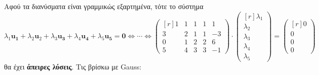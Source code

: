 \documentclass[a4paper,table]{report}
\begin{document}
Αφού τα διανύσματα είναι γραμμικώς εξαρτημένα, τότε το σύστημα
\[
  \lambda _{1} \mathbf{u_{1}}+ \lambda _{2} \mathbf{u}_{2} + \lambda _{3} \mathbf{u_{3}}+
  \lambda _{4} \mathbf{u_{4}} + \lambda _{5} \mathbf{u_{5}} = \mathbf{0} 
  \Leftrightarrow \cdots \Leftrightarrow 
  \begin{pmatrix*}[r]
    1 & 1 & 1 & 1 & 1  \\
    3 & 2 & 1 & 1 & -3 \\
    0 & 1 & 2 & 2 & 6  \\
    5 & 4 & 3 & 3 & -1
  \end{pmatrix*} \cdot 
  \begin{pmatrix*}[r] \lambda _{1} \\ \lambda _{2} \\ \lambda _{3} \\ \lambda _{4} \\
  \lambda _{5} \end{pmatrix*} = 
  \begin{pmatrix*}[r] 0 \\ 0 \\ 0 \\ 0 \end{pmatrix*}
\] 
θα έχει \textbf{άπειρες λύσεις}. Τις βρίσκω με Gauss:
\end{document}
